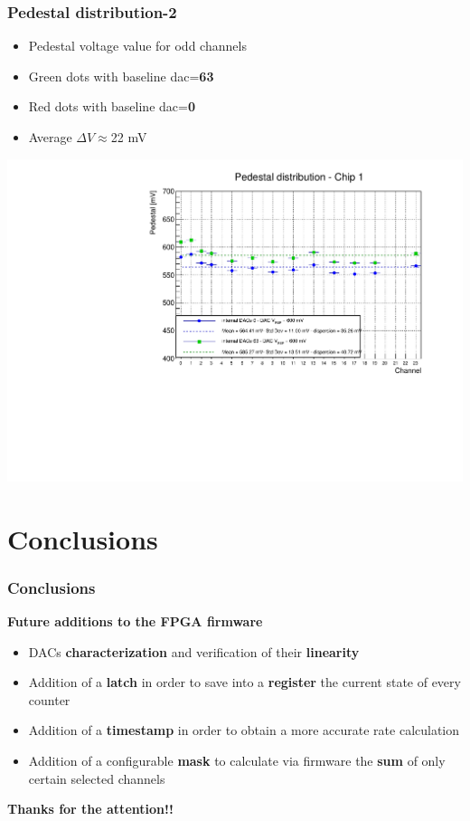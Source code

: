 \documentclass[aspectratio=169]{beamer}
\begin{document}
	\begin{frame}
	\frametitle{Pedestal distribution-2}
	\begin{itemize}
		\item Pedestal voltage value for odd channels
		\item {\color{green}Green} dots with baseline dac=\textbf{63}
		\item {\color{red}Red} dots with baseline dac=\textbf{0}
		\item Average $\Delta V\approx$22 mV
	\end{itemize}
	\begin{center}
		\includegraphics[width=0.55 \textwidth]{data/DAC_V_REF_600mV-Copia.pdf}
	\end{center}
	
\end{frame}

	\section{Conclusions}
	
	\begin{frame}
	\frametitle{Conclusions }
	\begin{center}
		{\color{blue}\textbf{Future additions to the FPGA firmware}}
	\end{center}
		\begin{itemize}
			\item DACs \textbf{characterization} and verification of their \textbf{linearity}
			\item Addition of a \textbf{latch} in order to save into a \textbf{register} the current state of every counter 
			\item Addition of a \textbf{timestamp} in order to obtain a more accurate rate calculation 
			\item Addition of a configurable \textbf{mask} to calculate via firmware the \textbf{sum} of only certain selected channels 		
		\end{itemize}
			\vspace{1 cm}
		\begin{center}
			\textbf{Thanks for the attention!!}
		\end{center}	
	\end{frame}
\end{document}
